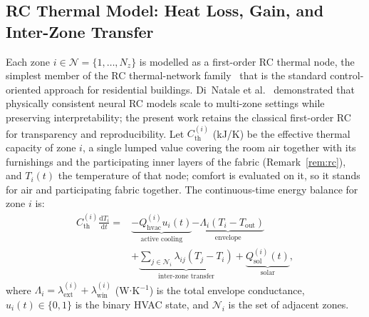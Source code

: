 \documentclass[3p,twocolumn,number]{elsarticle}
\newcommand{\Tout}{T_{\mathrm{out}}}
\newcommand{\Cth}{C_{\mathrm{th}}}
\newcommand{\lext}{\lambda_{\mathrm{ext}}}
\newcommand{\lwin}{\lambda_{\mathrm{win}}}
\newcommand{\lij}{\lambda_{ij}}
\newcommand{\Qhvac}{Q_{\mathrm{hvac}}}
\begin{document}
\subsection{RC Thermal Model: Heat Loss, Gain, and Inter-Zone Transfer}
\label{subsec:thermal}
 
Each zone $i\in\mathcal{N}=\{1,\ldots,N_z\}$ is modelled as a first-order RC thermal node, the simplest member of the RC thermal-network family~\cite{Drgoona2021,Wang2021RC,Shi2022} that is the standard control-oriented approach for residential buildings. Di~Natale et al.~\cite{DiNatale2023} demonstrated that physically consistent neural RC models scale to multi-zone settings while preserving interpretability; the present work retains the classical first-order RC for transparency and reproducibility. Let $\Cth^{(i)}$ (kJ/K) be the effective thermal capacity of zone $i$, a single lumped value covering the room air together with its furnishings and the participating inner layers of the fabric (Remark~\ref{rem:rc}), and $T_i(t)$ the temperature of that node; comfort is evaluated on it, so it stands for air and participating fabric together. The continuous-time energy balance for zone $i$ is:
\begin{equation}
\begin{split}
  \Cth^{(i)}\frac{\mathrm{d}T_i}{\mathrm{d}t}
  ={}&\underbrace{-\Qhvac^{(i)}u_i(t)}_{\text{active cooling}}
    \underbrace{-\Lambda_i\!\left(T_i-\Tout\right)}_{\text{envelope}}\\
  &+\underbrace{\sum_{j\in\mathcal{N}_i}\lij\!\left(T_j-T_i\right)}_{\text{inter-zone transfer}}
   +\underbrace{Q_{\mathrm{sol}}^{(i)}(t)}_{\text{solar}},
\end{split}
  \label{eq:rc_cont}
\end{equation}
where $\Lambda_i=\lext^{(i)}+\lwin^{(i)}$ (W$\cdot$K$^{-1}$) is the total envelope conductance, $u_i(t)\in\{0,1\}$ is the binary HVAC state, and $\mathcal{N}_i$ is the set of adjacent zones.
 
\end{document}
